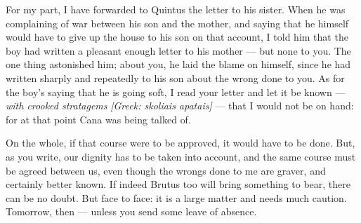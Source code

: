 

 For my part, I have forwarded to Quintus the letter to his sister. When he was complaining of war between his son and the mother, and saying that he himself would have to give up the house to his son on that account, I told him that the boy had written a pleasant enough letter to his mother --- but none to you. The one thing astonished him; about you, he laid the blame on himself, since he had written sharply and repeatedly to his son about the wrong done to you. As for the boy's saying that he is going soft, I read your letter and let it be known --- \textit{with crooked stratagems} \textit{[Greek: skoliais apatais]} --- that I would not be on hand: for at that point Cana was being talked of.

 On the whole, if that course were to be approved, it would have to be done. But, as you write, our dignity has to be taken into account, and the same course must be agreed between us, even though the wrongs done to me are graver, and certainly better known. If indeed Brutus too will bring something to bear, there can be no doubt. But face to face: it is a large matter and needs much caution. Tomorrow, then --- unless you send some leave of absence.
